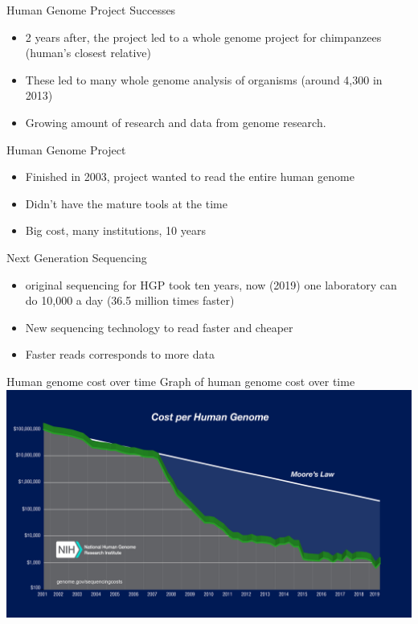 \documentclass{beamer}
\begin{document}
\begin{frame}{Human Genome Project Successes}
  \begin{itemize}   
    \item 2 years after, the project led to a whole genome project for chimpanzees (human's closest relative) \cite{campbell}
    \item These led to many whole genome analysis of organisms (around 4,300 in 2013) \cite{campbell}
    \item Growing amount of research and data from genome research.
  \end{itemize}
\end{frame}

\begin{frame}{Human Genome Project}
  \begin{itemize}   
    \item Finished in 2003, project wanted to read the entire human genome
    \item Didn't have the mature tools at the time
    \item Big cost, many institutions, 10 years \cite{introgenomics}
  \end{itemize}
\end{frame}

\begin{frame}{Next Generation Sequencing}
  \begin{itemize}
    \item original sequencing for HGP took ten years, now (2019) one laboratory can do 10,000 a day (36.5 million times faster)  \cite[p.~19]{introgenomics}   
    \item New sequencing technology to read faster and cheaper
    \item Faster reads corresponds to more data
  \end{itemize}
\end{frame}

\begin{frame}{Human genome cost over time}
Graph of human genome cost over time \cite{genomics-cost} \\
\centering
\includegraphics[scale=0.3]{human-gen-cost.jpg}
\end{frame}
    
\end{document}
